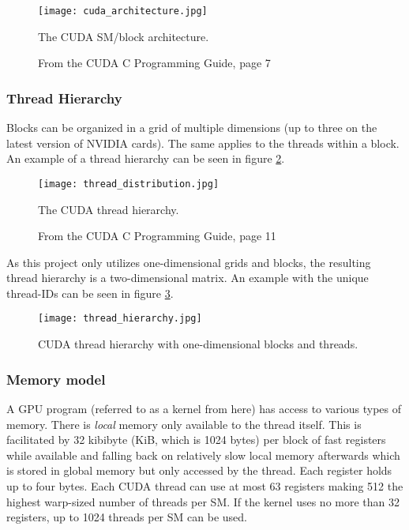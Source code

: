 \begin{figure}[H]\centering
\texttt{[image: cuda\_architecture.jpg]}
\caption{The CUDA SM/block architecture.\label{cuda_architecture}}
\caption*{From the CUDA C Programming Guide, page 7 \cite{nvidia2014programming}}
\end{figure}

\subsubsection{Thread Hierarchy}
Blocks can be organized in a grid of multiple dimensions (up to three on the latest version of NVIDIA cards). 
The same applies to the threads within a block.
An example of a thread hierarchy can be seen in figure \ref{thread_distribution}.

\begin{figure}[h!]\centering
\texttt{[image: thread\_distribution.jpg]}
\caption{The CUDA thread hierarchy.\label{thread_distribution}}
\caption*{From the CUDA C Programming Guide, page 11 \cite{nvidia2014programming}}
\end{figure}

As this project only utilizes one-dimensional grids and blocks, the resulting thread hierarchy is a two-dimensional matrix. 
An example with the unique thread-IDs can be seen in figure \ref{thread_hierarchy}.

\begin{figure}[h!]\centering
\texttt{[image: thread\_hierarchy.jpg]}
\caption{CUDA thread hierarchy with one-dimensional blocks and threads.\label{thread_hierarchy}}
\end{figure}


\subsubsection{Memory model}
A GPU program (referred to as a kernel from here) has access to various types of memory.
There is \emph{local} memory only available to the thread itself.
This is facilitated by 32 kibibyte (KiB, which is 1024 bytes) per block of fast registers while available and falling back on relatively slow local memory afterwards which is stored in global memory but only accessed by the thread.
Each register holds up to four bytes.
Each CUDA thread can use at most 63 registers making 512 the highest warp-sized number of threads per SM.
If the kernel uses no more than 32 registers, up to 1024 threads per SM can be used.

